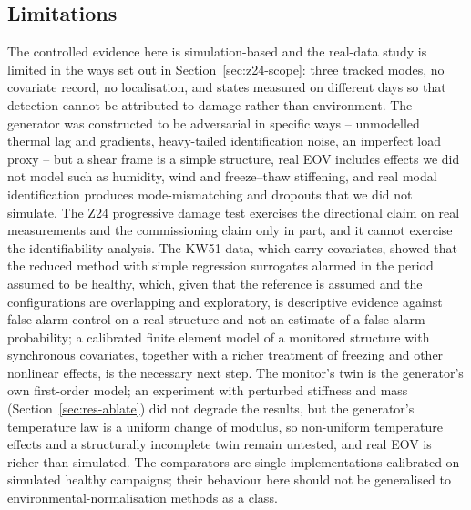 \documentclass[12pt,a4paper]{article}
\newcommand{\rev}[1]{#1}
\newcommand{\rev}[1]{{\color{revcol}#1}}
\newcommand{\rtwo}[1]{#1}
\newcommand{\rtwo}[1]{{\color{revcolb}#1}}
\begin{document}
\subsection{Limitations}\label{sec:limits}

The controlled evidence here is simulation-based and the real-data study is limited in the ways set out in Section~\ref{sec:z24-scope}: three tracked modes, no covariate record, no localisation, and states measured on different days so that detection cannot be attributed to damage rather than environment. The generator was constructed to be adversarial in specific ways -- unmodelled thermal lag and gradients, heavy-tailed identification noise, an imperfect load proxy -- but a shear frame is a simple structure, real EOV includes effects we did not model such as humidity, wind and freeze--thaw stiffening, and real modal identification produces mode-mismatching and dropouts that we did not simulate. The Z24 progressive damage test exercises the directional claim on real measurements and the commissioning claim only in part, and it cannot exercise the identifiability analysis. \rtwo{The KW51 data, which carry covariates, showed that the reduced method with simple regression surrogates alarmed in the period assumed to be healthy, which, given that the reference is assumed and the configurations are overlapping and exploratory, is descriptive evidence against false-alarm control on a real structure and not an estimate of a false-alarm probability; a calibrated finite element model of a monitored structure with synchronous covariates, together with a richer treatment of freezing and other nonlinear effects, is the necessary next step.} \rev{The monitor's twin is the generator's own first-order model; an experiment with perturbed stiffness and mass (Section~\ref{sec:res-ablate}) did not degrade the results, but the generator's temperature law is a uniform change of modulus, so non-uniform temperature effects and a structurally incomplete twin remain untested, and real EOV is richer than simulated. The comparators are single implementations calibrated on simulated healthy campaigns; their behaviour here should not be generalised to environmental-normalisation methods as a class.}
\end{document}
